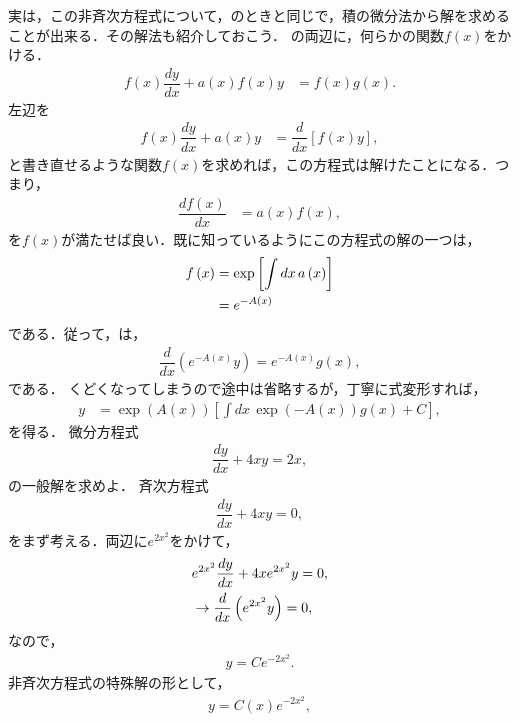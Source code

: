 実は，この非斉次方程式について，のときと同じで，積の微分法から解を求めることが出来る．その解法も紹介しておこう．
の両辺に，何らかの関数$f\left(x\right)$をかける．
\begin{align}
 f\left(x\right)\dfrac{dy}{dx}+a\left(x\right)f\left(x\right)y & =f(x)g\left(x\right).
 \label{eq:PDE_06_fx}
\end{align}
左辺を
\begin{align}
  f\left(x\right)\dfrac{dy}{dx}+a\left(x\right)y & =\dfrac{d}{dx}\left[f\left(x\right)y\right],
\end{align}
と書き直せるような関数$f\left(x\right)$を求めれば，この方程式は解けたことになる．つまり，
\begin{align}
 \dfrac{df\left(x\right)}{dx} & =a\left(x\right)f\left(x\right),
\end{align}
を$f\left(x\right)$が満たせば良い．既に知っているようにこの方程式の解の一つは，
\begin{align}
 f\left(x\right) & =\exp\left[\int dx\,a\left(x\right)\right]\notag \\ 
                 & =e^{-A\left(x\right)}
\end{align}
である．従って，は，
\begin{align}
 \dfrac{d}{dx}\left(e^{-A\left(x\right)}y\right) = e^{-A\left(x\right)}g\left(x\right), 
\end{align}
である．
くどくなってしまうので途中は省略するが，丁寧に式変形すれば，
\begin{align}
 y & =\exp\left(A\left(x\right)\right)\left[\int dx\,\exp\left(-A\left(x\right)\right)g\left(x\right)+C\right],
\end{align}
を得る．
%
%
\newpage
%
\gl
\reidai
微分方程式
\begin{align}
 \dfrac{dy}{dx} + 4x y= 2x,
\end{align}
の一般解を求めよ．
\gl
%
斉次方程式
\begin{align}
  \dfrac{dy}{dx} + 4xy = 0, 
\end{align}
をまず考える．両辺に$e^{2x^2}$をかけて，
\begin{align}
  &e^{2x^2}\dfrac{dy}{dx} + 4xe^{2x^2} y = 0, \notag \\
  &\rightarrow \dfrac{d}{dx}\left(e^{2x^2}y\right) = 0,
\end{align}
なので，
\begin{align}
  y = Ce^{-2x^2}. 
\end{align}
非斉次方程式の特殊解の形として，
\begin{align}
 y = C(x)e^{-2x^2}, 
\end{align}
